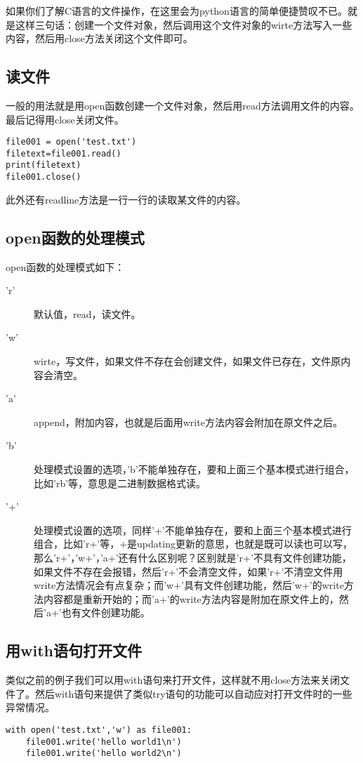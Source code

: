 \documentclass[12pt,oneside]{book}
\begin{document}
\begin{common-format}
如果你们了解C语言的文件操作，在这里会为python语言的简单便捷赞叹不已。就是这样三句话：创建一个文件对象，然后调用这个文件对象的wirte方法写入一些内容，然后用close方法关闭这个文件即可。


\subsection{读文件}
一般的用法就是用open函数创建一个文件对象，然后用read方法调用文件的内容。最后记得用close关闭文件。
\begin{Verbatim}
file001 = open('test.txt')
filetext=file001.read()
print(filetext)
file001.close()
\end{Verbatim}

此外还有readline方法是一行一行的读取某文件的内容。


\subsection{open函数的处理模式}
open函数的处理模式如下：
\begin{description}
\item['r'] 默认值，read，读文件。
\item['w'] wirte，写文件，如果文件不存在会创建文件，如果文件已存在，文件原内容会清空。
\item['a'] append，附加内容，也就是后面用write方法内容会附加在原文件之后。
\item['b'] 处理模式设置的选项，'b'不能单独存在，要和上面三个基本模式进行组合，比如'rb'等，意思是二进制数据格式读。
\item['+'] 处理模式设置的选项，同样'+'不能单独存在，要和上面三个基本模式进行组合，比如'r+'等，+是updating更新的意思，也就是既可以读也可以写，那么'r+'，'w+'，'a+'还有什么区别呢？区别就是'r+'不具有文件创建功能，如果文件不存在会报错，然后'r+'不会清空文件，如果'r+'不清空文件用write方法情况会有点复杂；而'w+'具有文件创建功能，然后'w+'的write方法内容都是重新开始的；而'a+'的write方法内容是附加在原文件上的，然后'a+'也有文件创建功能。
\end{description}



\subsection{用with语句打开文件}
类似之前的例子我们可以用with语句来打开文件，这样就不用close方法来关闭文件了。然后with语句来提供了类似try语句的功能可以自动应对打开文件时的一些异常情况。
\begin{Verbatim}
with open('test.txt','w') as file001:
    file001.write('hello world1\n')
    file001.write('hello world2\n')


\end{Verbatim}
\end{common-format}
\end{document}
